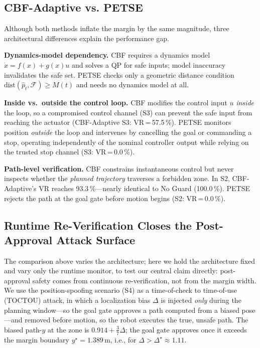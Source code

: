 \documentclass[conference]{IEEEtran}
\begin{document}
\subsection{CBF-Adaptive vs. PETSE}
Although both methods inflate the margin by the same magnitude, three architectural differences explain the performance gap.

\textbf{Dynamics-model dependency.} CBF requires a dynamics model $\dot{x}=f(x)+g(x)u$ and solves a QP for safe inputs; model inaccuracy invalidates the safe set. PETSE checks only a geometric distance condition $\mathrm{dist}(\hat{p}_t,\mathcal{F})\ge M(t)$ and needs no dynamics model at all.

\textbf{Inside vs.\ outside the control loop.} CBF modifies the control input $u$ \emph{inside} the loop, so a compromised control channel (S3) can prevent the safe input from reaching the actuator (CBF-Adaptive S3: VR\,=\,57.5\,\%). PETSE monitors position \emph{outside} the loop and intervenes by cancelling the goal or commanding a stop, operating independently of the nominal controller output while relying on the trusted stop channel (S3: VR\,=\,0.0\,\%).

\textbf{Path-level verification.} CBF constrains instantaneous control but never inspects whether the \emph{planned trajectory} traverses a forbidden zone. In S2, CBF-Adaptive's VR reaches 93.3\,\%---nearly identical to No Guard (100.0\,\%). PETSE rejects the path at the goal gate before motion begins (S2: VR\,=\,0.0\,\%).

\subsection{Runtime Re-Verification Closes the Post-Approval Attack Surface}\label{sec:reverify}

The comparison above varies the architecture; here we hold the architecture fixed and vary only the runtime monitor, to test our central claim directly: post-approval safety comes from continuous re-verification, not from the margin width. We use the position-spoofing scenario (S4) as a time-of-check to time-of-use (TOCTOU) attack, in which a localization bias $\Delta$ is injected \emph{only} during the planning window---so the goal gate approves a path computed from a biased pose---and removed before motion, so the robot executes the true, unsafe path. The biased path-$y$ at the zone is $0.914 + \frac{3}{7}\Delta$; the goal gate approves once it exceeds the margin boundary $y^\star{=}1.389$\,m, i.e., for $\Delta{>}\Delta^\star{\approx}1.11$.
\end{document}
